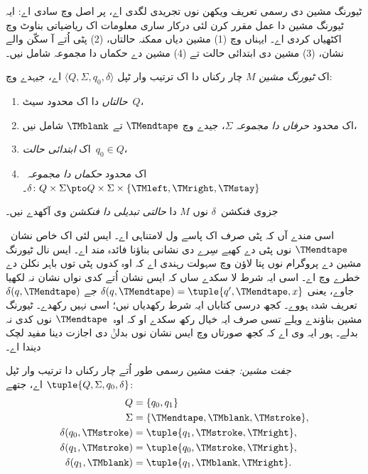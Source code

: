 \documentclass[../../../include/open-logic-section]{subfiles}
\begin{document}

\begin{explain}
ٹیورنگ مشین دی
رسمی تعریف ویکھن
نوں تجریدی لگدی اے،
پر اصل وچ سادی اے:
ایہ ٹیورنگ مشین
دا عمل مقرر کرن
لئی درکار ساری
معلومات اک ریاضیاتی
بناوٹ وچ اکٹھیاں
کردی اے۔ ایہناں
وچ (1) مشین دیاں
ممکنہ حالتاں،
(2) پٹی اُتے
آ سکّن والے
نشان، (3) مشین
دی ابتدائی حالت
تے (4) مشین دے
حکماں دا مجموعہ
شامل نیں۔
\end{explain}

\begin{defn}
اک \emph{ٹیورنگ مشین}
$M$ چار رکناں
دا اک ترتیب وار ٹپل
$\langle Q, \Sigma, q_0,
\delta\rangle$ اے،
جیہدے وچ:
\begin{enumerate}
\item \emph{حالتاں} دا اک
  محدود سیٹ~$Q$،
\item اک محدود
  \emph{حرفاں دا مجموعہ}
  $\Sigma$، جیدے وچ
  $\TMendtape$ تے
  $\TMblank$ شامل نیں،
\item اک \emph{ابتدائی
  حالت}~$q_0 \in Q$،
\item اک محدود
  \emph{حکماں دا مجموعہ}~$\delta\colon Q \times \Sigma
  \pto Q \times \Sigma \times \{\TMleft, \TMright, \TMstay\}$۔
\end{enumerate}
جزوی فنکشن~$\delta$
نوں $M$ دا
\emph{حالتی تبدیلی
دا فنکشن} وی
آکھدے نیں۔
\end{defn}

\begin{explain}
اسی مندے آں کہ
پٹی صرف اک پاسے
ول لامتناہی اے۔
ایس لئی اک خاص
نشان~$\TMendtape$
نوں پٹی دے کھبے
سِرے دی نشانی
بناؤنا فائدہ مند اے۔
ایس نال ٹیورنگ
مشین دے پروگرام
نوں پتا لاؤن وچ
سہولت رہندی اے
کہ اوہ کدوں پٹی
توں باہر نکلن
دے خطرے وچ اے۔
اسی ایہ شرط لا
سکدے ساں کہ ایس
نشان اُتے کدی
نواں نشان نہ لکھیا
جاوے، یعنی
$\delta(q,\TMendtape) = \tuple{q', \TMendtape, x}$
جے $\delta(q,\TMendtape)$
تعریف شدہ ہووے۔
کجھ درسی کتاباں
ایہ شرط رکھدیاں
نیں؛ اسی نہیں
رکھدے۔ ٹیورنگ
مشین بناؤندے
ویلے تسی صرف
ایہ خیال رکھ
سکدے او کہ
اوہ~$\TMendtape$
نوں کدی نہ بدلے۔
ہور ایہ وی
اے کہ کجھ
صورتاں وچ ایس
نشان نوں بدلݨ
دی اجازت دینا
مفید لچک دیندا
اے۔
\end{explain}

\begin{ex}
\emph{جفت مشین:}
جفت مشین رسمی
طور اُتے چار رکناں
دا ترتیب وار ٹپل
$\tuple{Q, \Sigma, q_0, \delta}$
اے، جتھے:
\begin{align*}
Q & = \{ q_0, q_1 \} \\
\Sigma & = \{ \TMendtape, \TMblank, \TMstroke \}, \\
\delta(q_0, \TMstroke) & = \tuple{q_1, \TMstroke, \TMright},\\
\delta(q_1, \TMstroke) & = \tuple{q_0, \TMstroke, \TMright},\\
\delta(q_1, \TMblank)  & = \tuple{q_1, \TMblank, \TMright}.
\end{align*}
\end{ex}
\end{document}
